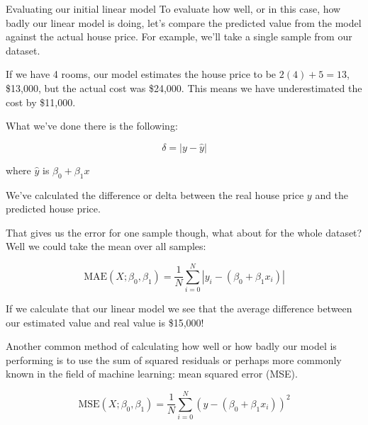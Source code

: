 \documentclass[10pt]{beamer}
\begin{document}
\begin{frame}[fragile,allowframebreaks,label=]{Evaluating our initial linear model}
To evaluate how well, or in this case, how badly our linear model is doing, let's
compare the predicted value from the model against the actual house price. For
example, we'll take a single sample from our dataset.

If we have 4 rooms, our model estimates the house price to be \(2(4) + 5 = 13\),
\$13,000, but the actual cost was \$24,000. This means we have underestimated the cost
by \$11,000.

What we've done there is the following:

\[
\delta = | y - \hat{y} |
\]

where \(\hat{y}\) is \(\beta_0 + \beta_1 x\)

We've calculated the difference or delta between the real house price \(y\) and the
predicted house price.

That gives us the error for one sample though, what about for the whole dataset? Well
we could take the mean over all samples:

\[
\text{MAE}(X; \beta_0,\beta_1) = \frac{1}{N}\sum_{i=0}^N | y_i - (\beta_0+\beta_1x_i) |
\]

If we calculate that our linear model we see that the average difference between our
estimated value and real value is \$15,000!

Another common method of calculating how well or how badly our model
is performing is to use the \alert{sum of squared residuals} or perhaps more
commonly known in the field of machine learning: mean squared error (MSE).

\[
\text{MSE}(X; \beta_0, \beta_1) = \frac{1}{N}\sum_{i=0}^N (y - (\beta_0 + \beta_1 x_i))^2
\]
\end{frame}
\end{document}

